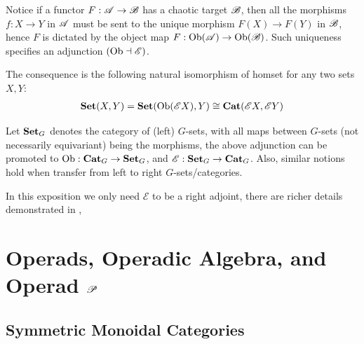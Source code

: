 \documentclass{article}
\begin{document}
Notice if a functor $F:\mathscr{A}\rightarrow\mathscr{B}$ has a chaotic target $\mathscr{B}$, then all the morphisms $f:X\rightarrow Y$ in $\mathscr{A}$ must be sent to the unique morphism $F(X)\rightarrow F(Y)$ in $\mathscr{B}$, hence $F$ is dictated by the object map $F:\mathrm{Ob}(\mathscr{A})\rightarrow\mathrm{Ob}(\mathscr{B})$. Such uniqueness specifies an adjunction $(\mathrm{Ob}\dashv \mathscr{E})$.

The consequence is the following natural isomorphism of homset for any two sets $X,Y$:
\begin{align}
    \mathbf{Set}(X,Y)=\mathbf{Set}(\mathrm{Ob}(\mathscr{E}X),Y)\cong \mathbf{Cat}(\mathscr{E}X,\mathscr{E}Y)
\end{align}

\begin{rem}\label{rem_equiv_chaot}
    Let $\mathbf{Set}_G$ denotes the category of (left) $G$-sets, with all maps between $G$-sets (not necessarily equivariant) being the morphisms, the above adjunction can be promoted to $\mathrm{Ob}:\mathbf{Cat}_G\rightarrow \mathbf{Set}_G$, and $\mathscr{E}:\mathbf{Set}_G\rightarrow\mathbf{Cat}_G$. Also, similar notions hold when transfer from left to right $G$-sets/categories.
\end{rem}

In this exposition we only need $\mathscr{E}$ to be a right adjoint, there are richer details demonstrated in \cite{GM17}, 

\newpage

\section{Operads, Operadic Algebra, and Operad $\mathscr{P}$}\label{sec_operad}
\subsection{Symmetric Monoidal Categories}\label{sub_symmon}
\end{document}
